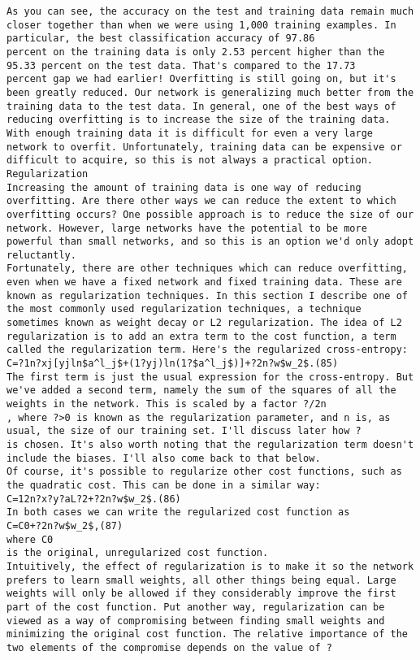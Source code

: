 \begin{lstlisting}
As you can see, the accuracy on the test and training data remain much closer together than when we were using 1,000 training examples. In particular, the best classification accuracy of 97.86
percent on the training data is only 2.53 percent higher than the 95.33 percent on the test data. That's compared to the 17.73
percent gap we had earlier! Overfitting is still going on, but it's been greatly reduced. Our network is generalizing much better from the training data to the test data. In general, one of the best ways of reducing overfitting is to increase the size of the training data. With enough training data it is difficult for even a very large network to overfit. Unfortunately, training data can be expensive or difficult to acquire, so this is not always a practical option.
Regularization
Increasing the amount of training data is one way of reducing overfitting. Are there other ways we can reduce the extent to which overfitting occurs? One possible approach is to reduce the size of our network. However, large networks have the potential to be more powerful than small networks, and so this is an option we'd only adopt reluctantly.
Fortunately, there are other techniques which can reduce overfitting, even when we have a fixed network and fixed training data. These are known as regularization techniques. In this section I describe one of the most commonly used regularization techniques, a technique sometimes known as weight decay or L2 regularization. The idea of L2 regularization is to add an extra term to the cost function, a term called the regularization term. Here's the regularized cross-entropy:
C=?1n?xj[yjln$a^l_j$+(1?yj)ln(1?$a^l_j$)]+?2n?w$w_2$.(85)
The first term is just the usual expression for the cross-entropy. But we've added a second term, namely the sum of the squares of all the weights in the network. This is scaled by a factor ?/2n
, where ?>0 is known as the regularization parameter, and n is, as usual, the size of our training set. I'll discuss later how ?
is chosen. It's also worth noting that the regularization term doesn't include the biases. I'll also come back to that below.
Of course, it's possible to regularize other cost functions, such as the quadratic cost. This can be done in a similar way:
C=12n?x?y?aL?2+?2n?w$w_2$.(86)
In both cases we can write the regularized cost function as 
C=C0+?2n?w$w_2$,(87)
where C0
is the original, unregularized cost function.
Intuitively, the effect of regularization is to make it so the network prefers to learn small weights, all other things being equal. Large weights will only be allowed if they considerably improve the first part of the cost function. Put another way, regularization can be viewed as a way of compromising between finding small weights and minimizing the original cost function. The relative importance of the two elements of the compromise depends on the value of ?

\end{lstlisting}
